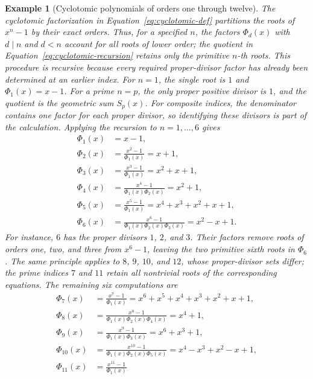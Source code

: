 \documentclass[11pt,a4paper]{article}
\numberwithin{equation}{section}
\theoremstyle{uprightpaper}
\newtheorem{example}{Example}[section]
\begin{document}
\begin{example}[Cyclotomic polynomials of orders one through twelve]\label{ex:cyclosmall}
The cyclotomic factorization in Equation~\eqref{eq:cyclotomic-def}
partitions the roots of $x^n-1$ by their exact orders. Thus, for a
specified $n$, the factors $\Phi_d(x)$ with $d\mid n$ and $d<n$
account for all roots of lower order; the quotient in
Equation~\eqref{eq:cyclotomic-recursion} retains only the primitive
$n$-th roots. This procedure is recursive because every required
proper-divisor factor has already been determined at an earlier index.
For $n=1$, the single root is $1$ and $\Phi_1(x)=x-1$. For a prime
$n=p$, the only proper positive divisor is $1$, and the quotient is
the geometric sum $S_p(x)$. For composite indices, the denominator
contains one factor for each proper divisor, so identifying these
divisors is part of the calculation. Applying the recursion to
$n=1,\ldots,6$ gives
\begin{align}
 \Phi_1(x)&=x-1,\label{eq:cyclo-1}\\
 \Phi_2(x)&=\frac{x^2-1}{\Phi_1(x)}=x+1,\label{eq:cyclo-2}\\
 \Phi_3(x)&=\frac{x^3-1}{\Phi_1(x)}=x^2+x+1,\label{eq:cyclo-3}\\
 \Phi_4(x)&=\frac{x^4-1}{\Phi_1(x)\Phi_2(x)}=x^2+1,\label{eq:cyclo-4}\\
 \Phi_5(x)&=\frac{x^5-1}{\Phi_1(x)}=x^4+x^3+x^2+x+1,\label{eq:cyclo-5}\\
 \Phi_6(x)&=\frac{x^6-1}{\Phi_1(x)\Phi_2(x)\Phi_3(x)}
 =x^2-x+1.\label{eq:cyclo-examples}
\end{align}
For instance, $6$ has the proper divisors $1$, $2$, and $3$.
Their factors remove roots of orders one, two, and three from
$x^6-1$, leaving the two primitive sixth roots in $\Phi_6$.
The same principle applies to $8$, $9$, $10$, and $12$, whose
proper-divisor sets differ; the prime indices $7$ and $11$ retain
all nontrivial roots of the corresponding equations. The remaining
six computations are
\begin{align}
 \Phi_7(x)&=\frac{x^7-1}{\Phi_1(x)}
 =x^6+x^5+x^4+x^3+x^2+x+1,\label{eq:cyclo-7}\\
 \Phi_8(x)&=\frac{x^8-1}{\Phi_1(x)\Phi_2(x)\Phi_4(x)}
 =x^4+1,\label{eq:cyclo-8}\\
 \Phi_9(x)&=\frac{x^9-1}{\Phi_1(x)\Phi_3(x)}
 =x^6+x^3+1,\label{eq:cyclo-9}\\
 \Phi_{10}(x)&=\frac{x^{10}-1}{\Phi_1(x)\Phi_2(x)\Phi_5(x)}
 =x^4-x^3+x^2-x+1,\label{eq:cyclo-10}\\
 \Phi_{11}(x)&=\frac{x^{11}-1}{\Phi_1(x)}

\end{align}
\end{example}
\end{document}
